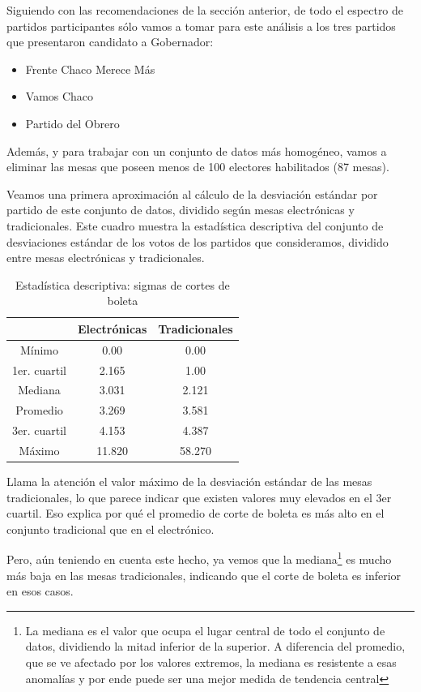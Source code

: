 \documentclass[12pt,a4paper]{article}
\begin{document}
Siguiendo con las recomendaciones de la sección anterior, de todo el espectro de
partidos participantes sólo vamos a tomar para este análisis a los tres partidos
que presentaron candidato a Gobernador:

\begin{itemize}
  \item Frente Chaco Merece Más
  \item Vamos Chaco
  \item Partido del Obrero
\end{itemize}

Además, y para trabajar con un conjunto de datos más homogéneo, vamos a eliminar
las mesas que poseen menos de 100 electores habilitados (87 mesas).

Veamos una primera aproximación al cálculo de la desviación estándar por partido
de este conjunto de datos, dividido según mesas electrónicas y tradicionales.
Este cuadro muestra la estadística descriptiva del conjunto de desviaciones
estándar de los votos de los partidos que consideramos, dividido entre mesas
electrónicas y tradicionales.

\begin{table}[h!]
\centering
\label{my-label}
\begin{tabular}{c c c}
 & Electrónicas & Tradicionales \\
\hline
Mínimo & 0.00 & 0.00 \\
1er. cuartil & 2.165 & 1.00 \\
Mediana & 3.031 & 2.121 \\
Promedio & 3.269 & 3.581 \\
3er. cuartil & 4.153 & 4.387 \\
Máximo & 11.820 & 58.270 \\
\hline
\end{tabular}
\caption{Estadística descriptiva: sigmas de cortes de boleta}
\label{table:1}
\end{table}

Llama la atención el valor máximo de la desviación estándar de las mesas
tradicionales, lo que parece indicar que existen valores muy elevados en el 3er
cuartil. Eso explica por qué el promedio de corte de boleta es más alto en el
conjunto tradicional que en el electrónico.

Pero, aún teniendo en cuenta este hecho, ya vemos que la mediana\footnote{La
  mediana es el valor que ocupa el lugar central de todo el conjunto de datos,
  dividiendo la mitad inferior de la superior. A diferencia del promedio, que se
ve afectado por los valores extremos, la mediana es resistente a esas anomalías
y por ende puede ser una mejor medida de tendencia central} es mucho más baja
en las mesas tradicionales, indicando que el corte de boleta es inferior en esos casos.
\end{document}
